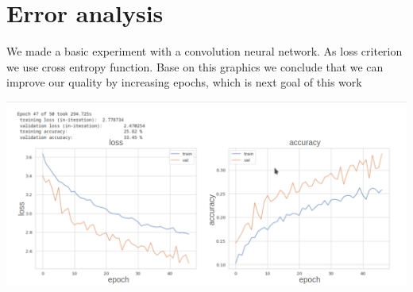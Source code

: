 \documentclass{article}
\begin{document}
\section{Error analysis}
We made a basic experiment with a convolution neural network. As loss criterion we use cross entropy function. Base on this graphics we conclude that we can improve our quality by increasing epochs, which is next goal of this work
\begin{center}
\includegraphics[width=1\textwidth]{Loss plots.png}
\end{center}
\end{document}
